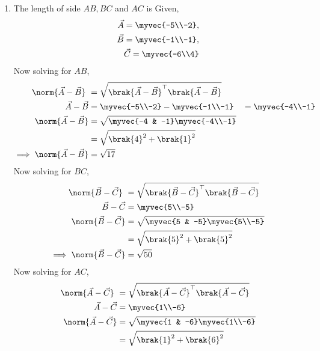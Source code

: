 \documentclass[11pt]{book}
\begin{document}
\begin{enumerate}[label=\thesection.\arabic*.,ref=\thesection.\theenumi]
\begin{enumerate}
 \end{enumerate}
 \item The length of side $AB,BC$ and $AC$ is
\solution
Given, 
\begin{align}
\vec{A} = \myvec{-5\\-2},\\
\vec{B} = \myvec{-1\\-1},\\
\vec{C} = \myvec{-6\\4} 
\end{align}
Now solving for $AB$,\\
\begin{align}
\norm{\vec{A}-\vec{B}}\ &=  \sqrt{\brak{\vec{A}-\vec{B}}^{\top}\brak{\vec{A}-\vec{B}}} \\
	\vec{A}-\vec{B} &= \myvec{-5\\-2} - \myvec{-1\\-1} &= \myvec{-4\\-1}\\
\norm{\vec{A}-\vec{B}} &= \sqrt{\myvec{-4 & -1}\myvec{-4\\-1}}\\
&= \sqrt{\brak{4}^2 +\brak{1}^2}\\
	\implies \norm{\vec{A}-\vec{B}} &=\sqrt{17}
\end{align}
Now solving for $BC$,\\
\begin{align}
	\norm{\vec{B}-\vec{C}}\ &=  \sqrt{\brak{\vec{B}-\vec{C}}^{\top}\brak{\vec{B}-\vec{C}}} \\
\vec{B}-\vec{C} &= \myvec{5\\-5}\\
\norm{\vec{B}-\vec{C}} &= \sqrt{\myvec{5 & -5}\myvec{5\\-5}}\\
&= \sqrt{\brak{5}^2+\brak{5}^2}\\
\implies \norm{\vec{B}-\vec{C}} &= \sqrt{50}
\end{align}
Now solving for $AC$,\\
\begin{align}
	\norm{\vec{A}-\vec{C}}\ &=  \sqrt{\brak{\vec{A}-\vec{C}}^{\top}\brak{\vec{A}-\vec{C}}} \\
\vec{A}-\vec{C} &= \myvec{1\\-6}\\
\norm{\vec{A}-\vec{C}} &= \sqrt{\myvec{1 & -6}\myvec{1\\-6}}\\
&= \sqrt{\brak{1}^2+\brak{6}^2}\\

\end{align}
\end{enumerate}
\end{document}
